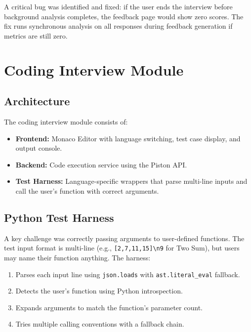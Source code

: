 A critical bug was identified and fixed: if the user ends the interview before background analysis completes, the feedback page would show zero scores. The fix runs synchronous analysis on all responses during feedback generation if metrics are still zero.

\section{Coding Interview Module}

\subsection{Architecture}

The coding interview module consists of:
\begin{itemize}
    \item \textbf{Frontend:} Monaco Editor with language switching, test case display, and output console.
    \item \textbf{Backend:} Code execution service using the Piston API.
    \item \textbf{Test Harness:} Language-specific wrappers that parse multi-line inputs and call the user's function with correct arguments.
\end{itemize}

\subsection{Python Test Harness}

A key challenge was correctly passing arguments to user-defined functions. The test input format is multi-line (e.g., \texttt{[2,7,11,15]\textbackslash n9} for Two Sum), but users may name their function anything. The harness:

\begin{enumerate}
    \item Parses each input line using \texttt{json.loads} with \texttt{ast.literal\_eval} fallback.
    \item Detects the user's function using Python introspection.
    \item Expands arguments to match the function's parameter count.
    \item Tries multiple calling conventions with a fallback chain.
\end{enumerate}


